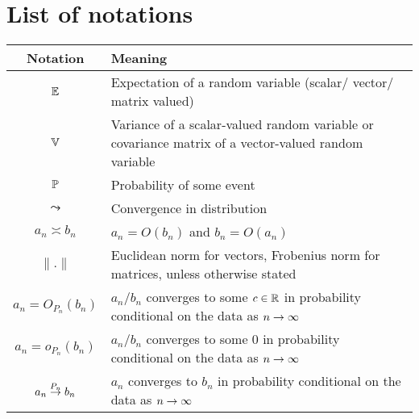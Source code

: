\chapter*{List of notations}

\begin{table}[h]
\centering
\begin{tabular}{cp{5in}}
\hline
Notation & Meaning \\\hline
${\mathbb{E}}$ & Expectation of a random variable (scalar/ vector/ matrix valued)\\
${\mathbb{V}}$ & Variance of a scalar-valued random variable or covariance matrix of a vector-valued random variable\\
${\mathbb{P}}$ & Probability of some event\\
$\leadsto$ & Convergence in distribution\\
$a_n \asymp b_n$ & $a_n = O(b_n)$ and $b_n = O(a_n)$ \\
$\|.\|$ & Euclidean norm for vectors, Frobenius norm for matrices, unless otherwise stated\\
$a_n  = O_{P_n} (b_n)$ & $a_n/b_n$ converges to some $c \in {\mathbb{R}}$ in probability conditional on the data as $n \rightarrow \infty$ \\
$a_n  = o_{P_n} (b_n)$ & $a_n/b_n$ converges to some $0$ in probability conditional on the data as $n \rightarrow \infty$ \\$a_n  \stackrel{P_n}{\rightarrow} b_n$ & $a_n$ converges to $b_n$ in probability conditional on the data as $n \rightarrow \infty$ \\\hline 
\end{tabular}
\end{table}